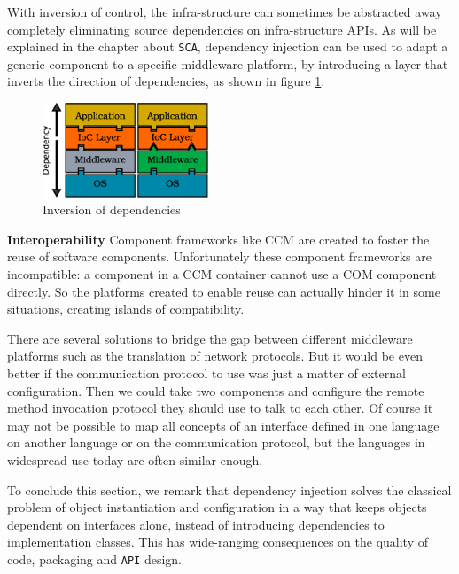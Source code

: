 With inversion of control, the infra-structure can sometimes be abstracted away completely eliminating source dependencies
on infra-structure APIs. As will be explained in the chapter about \texttt{SCA}, dependency injection can be used to adapt
a generic component to a specific middleware platform, by introducing a layer that inverts the direction of dependencies,
as shown in figure \ref{fig:good_layers}.

\begin{figure}
\centering
\includegraphics[height=80pt]{graphics_tables/good_layers.eps}
\caption{Inversion of dependencies}
\label{fig:good_layers}
\end{figure}


\textbf{Interoperability} Component frameworks like CCM are created to foster the reuse of software components.
Unfortunately these component frameworks are incompatible: a component in a CCM container cannot use a COM
component directly. So the platforms created to enable reuse can actually hinder it in some situations, creating
islands of compatibility. 

There are several solutions to bridge the gap between different middleware platforms such as the translation of
network protocols. But it would be even better if the communication protocol to use was just a matter of external
configuration. Then we could take two components and configure the remote method invocation protocol they should
use to talk to each other. Of course it may not be possible to map all concepts of an interface defined in one language
on another language or on the communication protocol, but the languages in widespread use today are often similar enough.

To conclude this section, we remark that dependency injection solves the classical problem of object instantiation
and configuration in a way that keeps objects dependent on interfaces alone, instead of introducing dependencies
to implementation classes. This has wide-ranging consequences on the quality of code, packaging and \texttt{API} design.